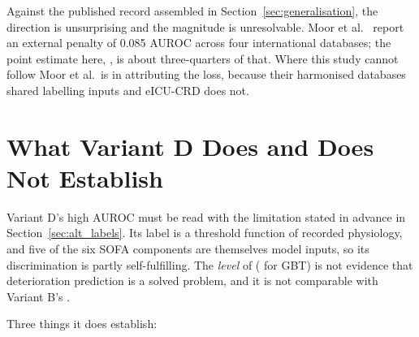 Against the published record assembled in Section~\ref{sec:generalisation},
the direction is unsurprising and the magnitude is unresolvable. Moor et al.\
\cite{moor2023review} report an external penalty of 0.085 AUROC across four
international databases; the point estimate here, \pcHFiveEst, is about
three-quarters of that. Where this study cannot follow Moor et al.\ is in
attributing the loss, because their harmonised databases shared labelling
inputs and eICU-CRD does not.


\section{What Variant D Does and Does Not Establish}
\label{sec:variant_d_establishes}

Variant D's high AUROC must be read with the limitation stated in advance in
Section~\ref{sec:alt_labels}. Its label is a threshold function of recorded
physiology, and five of the six SOFA components are themselves model inputs, so
its discrimination is partly self-fulfilling. The \emph{level} of
\pcAltAurocFullPrimaryD{} (\pcAltAurocFullGbtD{} for GBT) is not evidence that
deterioration prediction is a solved problem, and it is not comparable with
Variant B's \pcAurocPrimaryB.

Three things it does establish:

